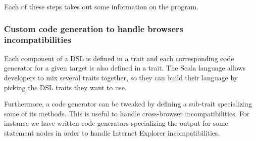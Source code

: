 \documentclass[american,english,runningheads]{llncs}
\newcommand{\eg}{\emph{e.g.}}
\begin{document}
Each of these steps takes out some information on the program.

\subsubsection{Custom code generation to handle browsers incompatibilities}

Each component of a DSL is defined in a trait and each corresponding code generator for a given target is also
defined in a trait. The Scala language allows developers to mix several traits together, so they can build their
language by picking the DSL traits they want to use.

Furthermore, a code generator can be tweaked by defining a sub-trait specializing some of its methods. This is useful
to handle cross-browser incompatibilities. For instance we have written code generators specializing the output for
some statement nodes in order to handle Internet Explorer incompatibilities.

% 
% 
% 
% 
% 
% 
\end{document}
